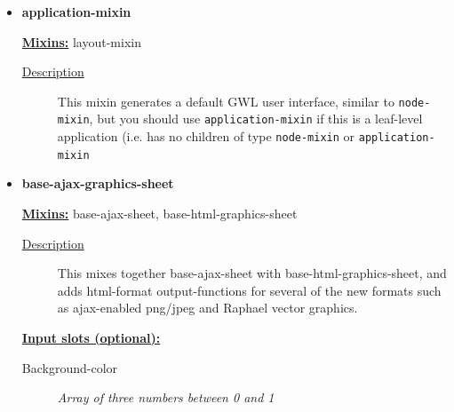 \documentclass [11pt]{book}
\begin{document}
\begin{itemize}

\item {}
\label{prim:application-mixin}
\textbf{application-mixin}


\textbf{
\underline{Mixins:}} layout-mixin





\begin{description}

\item [
\underline{Description}]


This mixin generates a default GWL user interface, similar to \texttt{node-mixin}, but you should use
\texttt{application-mixin} if this is a leaf-level application (i.e. has no children of type \texttt{node-mixin}
or \texttt{application-mixin}



\end{description}









\item {}
\label{prim:base-ajax-graphics-sheet}
\textbf{base-ajax-graphics-sheet}


\textbf{
\underline{Mixins:}} base-ajax-sheet, base-html-graphics-sheet





\begin{description}

\item [
\underline{Description}]


This mixes together base-ajax-sheet 
with base-html-graphics-sheet, and adds html-format output-functions 
for several of the new formats such as ajax-enabled png/jpeg and 
Raphael vector graphics.



\end{description}








\textbf{
\underline{Input slots (optional):}}

\begin{description}

\item [Background-color]
\emph{Array of three numbers between 0 and 1}


\end{description}
\end{itemize}
\end{document}
